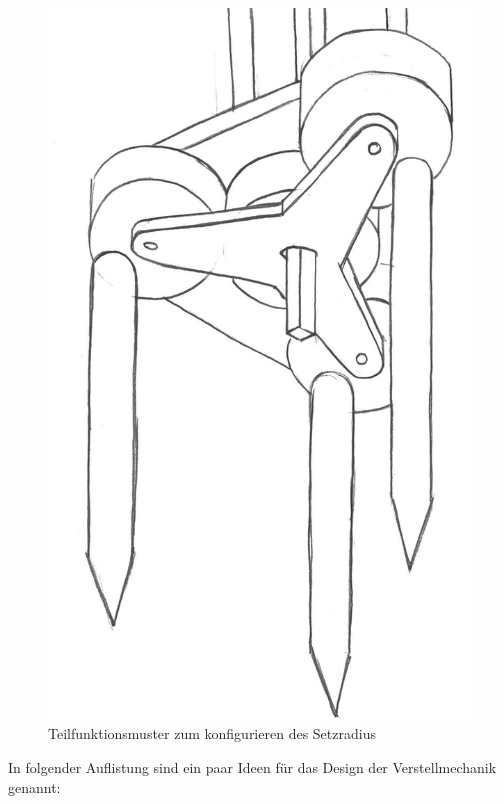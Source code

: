 \begin{figure}[H]
	\includegraphics[scale=0.55]{Illustrationen/5-Konzept/blau_Verstellmechanismus.jpg}
	\caption{Teilfunktionsmuster zum konfigurieren des Setzradius}
	\label{fig:blau_verstellmech}
\end{figure}

In folgender Auflistung sind ein paar Ideen für das Design der Verstellmechanik genannt:

